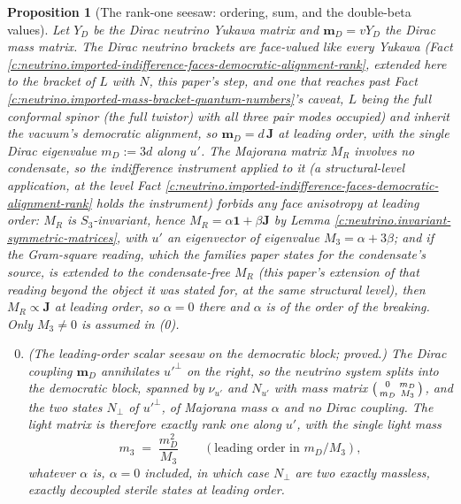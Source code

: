 \documentclass[11pt]{article}
\newtheorem{proposition}[theorem]{Proposition}
\theoremstyle{definition}
\theoremstyle{plain}
\newcommand{\changedmark}[2]{\marginpar{\raggedright\scriptsize\color{#1}#2}}
\providecommand{\J}{}\renewcommand{\J}{\mathbf{J}}
\providecommand{\mD}{}\renewcommand{\mD}{\mathbf{m}_{D}}
\begin{document}
\begin{proposition}[The rank-one seesaw: ordering, sum, and the double-beta values]\label{c:neutrino.rank-one-seesaw-ordering-sum-double}
\changedmark{gray}{reworded}
Let $Y_{D}$ be the Dirac neutrino Yukawa matrix and $\mD = vY_{D}$ the Dirac mass matrix. The Dirac neutrino brackets are face-valued like every Yukawa (Fact \ref{c:neutrino.imported-indifference-faces-democratic-alignment-rank}, extended here to the bracket of $L$ with $N$, this paper's step, and one that reaches past Fact \ref{c:neutrino.imported-mass-bracket-quantum-numbers}'s caveat, $L$ being the full conformal spinor (the full twistor) with all three pair modes occupied) and inherit the vacuum's democratic alignment, so $\mD = d\,\J$ at leading order, with the single Dirac eigenvalue $m_{D} := 3d$ along $u'$. The Majorana matrix $M_{R}$ involves no condensate, so the indifference instrument applied to it (a structural-level application, at the level Fact \ref{c:neutrino.imported-indifference-faces-democratic-alignment-rank} holds the instrument) forbids any face anisotropy at leading order: $M_{R}$ is $S_{3}$-invariant, hence $M_{R} = \alpha\mathbf{1} + \beta\J$ by Lemma \ref{c:neutrino.invariant-symmetric-matrices}, with $u'$ an eigenvector of eigenvalue $M_{3} = \alpha + 3\beta$; and if the Gram-square reading, which the families paper states for the condensate's source, is extended to the condensate-free $M_{R}$ (this paper's extension of that reading beyond the object it was stated for, at the same structural level), then $M_{R} \propto \J$ at leading order, so $\alpha = 0$ there and $\alpha$ is of the order of the breaking. Only $M_{3} \neq 0$ is assumed in (0).
\begin{enumerate}
\setcounter{enumi}{-1}
\item \emph{(The leading-order scalar seesaw on the democratic block; proved.)} The Dirac coupling $\mD$ annihilates $u'^{\perp}$ on the right, so the neutrino system splits into the democratic block, spanned by $\nu_{u'}$ and $N_{u'}$ with mass matrix $\begin{psmallmatrix} 0 & m_{D} \\ m_{D} & M_{3}\end{psmallmatrix}$, and the two states $N_{\perp}$ of $u'^{\perp}$, of Majorana mass $\alpha$ and no Dirac coupling. The light matrix is therefore exactly rank one along $u'$, with the single light mass
\[
m_{3} \;=\; \frac{m_{D}^{2}}{M_{3}} \qquad(\text{leading order in } m_{D}/M_{3}),
\]
whatever $\alpha$ is, $\alpha = 0$ included, in which case $N_{\perp}$ are two exactly massless, exactly decoupled sterile states at leading order.

\end{enumerate}
\end{proposition}
\end{document}
